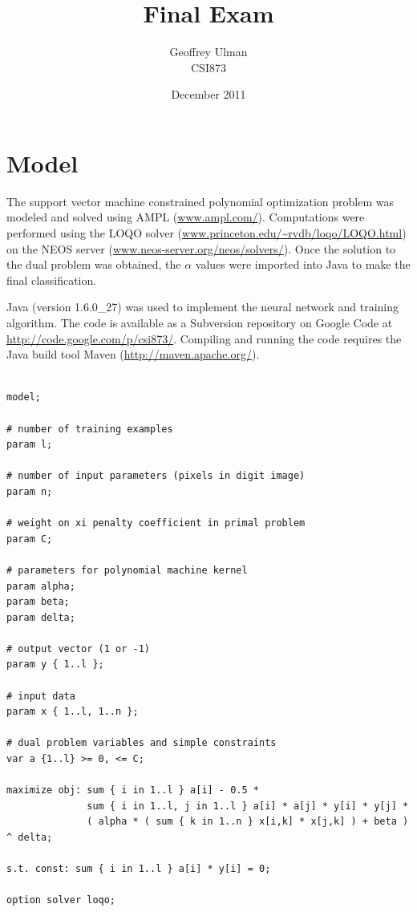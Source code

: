 \documentclass{article}
\begin{document}
\title{Final Exam}
\author{Geoffrey Ulman\\
        CSI873}
\date{December 2011}
\maketitle

\section{Model}\label{Model}

The support vector machine constrained polynomial optimization problem was modeled and solved using AMPL (\url{www.ampl.com/}). Computations were performed using the LOQO solver (\url{www.princeton.edu/~rvdb/loqo/LOQO.html}) on the NEOS server (\url{www.neos-server.org/neos/solvers/}). Once the solution to the dual problem was obtained, the \(\alpha\) values were imported into Java to make the final classification.

Java (version 1.6.0\_27) was used to implement the neural network and training algorithm. The code is available as a Subversion repository on Google Code at \url{http://code.google.com/p/csi873/}. Compiling and running the code requires the Java build tool Maven (\url{http://maven.apache.org/}).

\begin{verbatim}

model;

# number of training examples
param l;

# number of input parameters (pixels in digit image)
param n;

# weight on xi penalty coefficient in primal problem
param C;

# parameters for polynomial machine kernel
param alpha;
param beta;
param delta;

# output vector (1 or -1)
param y { 1..l };

# input data
param x { 1..l, 1..n };

# dual problem variables and simple constraints
var a {1..l} >= 0, <= C;

maximize obj: sum { i in 1..l } a[i] - 0.5 *
              sum { i in 1..l, j in 1..l } a[i] * a[j] * y[i] * y[j] *
              ( alpha * ( sum { k in 1..n } x[i,k] * x[j,k] ) + beta ) ^ delta;

s.t. const: sum { i in 1..l } a[i] * y[i] = 0;

option solver loqo;

\end{verbatim}
\end{document}
